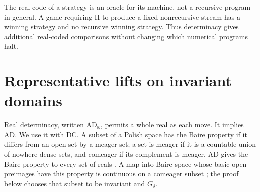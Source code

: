 \documentclass[11pt]{article}
\theoremstyle{definition}
\begin{document}
The real code of a strategy is an oracle for its machine, not a
recursive program in general. A game requiring II to produce a fixed
nonrecursive stream has a winning strategy and no recursive winning
strategy. Thus determinacy gives additional real-coded comparisons
without changing which numerical programs halt.

\section{Representative lifts on invariant domains}\label{sec:lifts}

Real determinacy, written $\mathrm{AD}_{\mathbb R}$, permits a
whole real as each move. It implies AD. We use it with DC.
A subset of a Polish space has the Baire property if it differs
from an open set by a meager set; a set is meager if it is a
countable union of nowhere dense sets, and comeager if its complement
is meager. AD gives the Baire property to every set of reals
\cite[Theorem 2.7]{KoellnerWoodin}. A map into Baire space whose
basic-open preimages have this property is continuous on a comeager
subset \cite[p.~50]{Ikegami}; the proof below chooses that subset
to be invariant and $G_\delta$.
\end{document}
